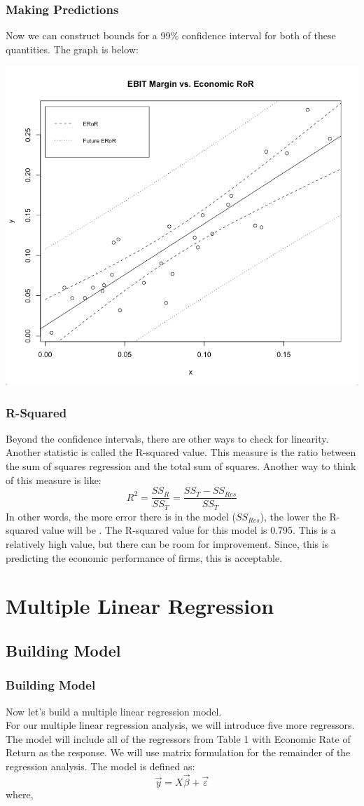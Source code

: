 \documentclass[12pt]{beamer}
\begin{document}
\begin{frame}
\frametitle{Making Predictions}
Now we can construct bounds for a 99\% confidence interval for both of these quantities. The graph is below:
\begin{center}
\includegraphics[scale=0.25]{99CI.png}
\end{center}
\end{frame}

\begin{frame}
\frametitle{R-Squared}
Beyond the confidence intervals, there are other ways to check for linearity. Another statistic is called the R-squared value. This measure is the ratio between the sum of squares regression and the total sum of squares. Another way to think of this measure is like: $$R^2=\frac{SS_R}{SS_T}=\frac{SS_T-SS_{Res}}{SS_T}$$ In other words, the more error there is in the model ($SS_{Res}$), the lower the R-squared value will be \cite{text2}. The R-squared value for this model is 0.795. This is a relatively high value, but there can be room for improvement. Since, this is predicting the economic performance of firms, this is acceptable.
\end{frame}

\section{Multiple Linear Regression}
\subsection{Building Model}
\begin{frame}
\frametitle{Building Model}
Now let's build a multiple linear regression model.\\[3mm]
For our multiple linear regression analysis, we will introduce five more regressors. The model will include all of the regressors from Table 1 with Economic Rate of Return as the response. We will use matrix formulation for the remainder of the regression analysis. The model is defined as: $$\vec{y}=X\vec{\beta}+\vec{\varepsilon}$$ where,
\end{frame}
\end{document}
